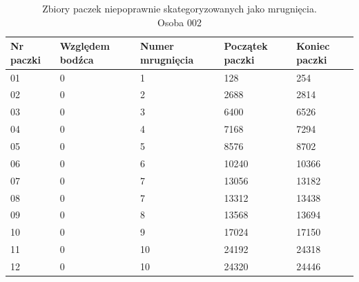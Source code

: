 \documentclass{article}
\begin{document}
            \begin{table}[H]
                \captionsetup{justification=centering}
                \caption {Zbiory paczek niepoprawnie skategoryzowanych jako mrugnięcia. \\Osoba 002}
                \begin{center}
                    \begin{tabular}{| p{1cm} | p{1.75cm} | p{1.75cm} | p{1.75cm} | p{1.75cm} |}
                        \hline
                        Nr paczki & Względem bodźca & Numer mrugnięcia & Początek paczki & Koniec paczki \\
                        \hline
                        \hline
                        01 & 0 & 1 & 128 & 254 \\
                        \hline
                        02 & 0 & 2 & 2688 & 2814 \\
                        \hline
                        03 & 0 & 3 & 6400 & 6526 \\
                        \hline
                        04 & 0 & 4 & 7168 & 7294 \\
                        \hline
                        05 & 0 & 5 & 8576 & 8702 \\
                        \hline
                        06 & 0 & 6 & 10240 & 10366 \\
                        \hline
                        07 & 0 & 7 & 13056 & 13182 \\
                        \hline
                        08 & 0 & 7 & 13312 & 13438 \\
                        \hline
                        09 & 0 & 8 & 13568 & 13694 \\
                        \hline
                        10 & 0 & 9 & 17024 & 17150 \\
                        \hline
                        11 & 0 & 10 & 24192 & 24318 \\
                        \hline
                        12 & 0 & 10 & 24320 & 24446 \\
                        \hline
                    \end{tabular}
                \end{center}
            \end{table}
\end{document}
